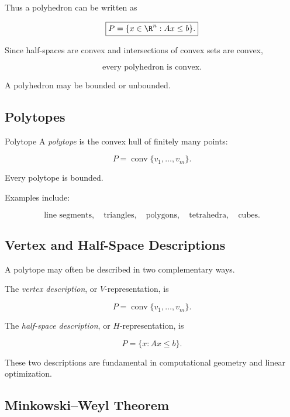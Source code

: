 Thus a polyhedron can be written as

\[
\boxed{
P=
\{x\in\R^n:Ax\leq b\}.
}
\]

Since half-spaces are convex and intersections of convex sets are convex,

\[
\boxed{
\text{every polyhedron is convex}.
}
\]

A polyhedron may be bounded or unbounded.

\subsection{Polytopes}
\label{subsec:polytopes}

\begin{definitionbox}{Polytope}
A \emph{polytope} is the convex hull of finitely many points:

\[
\boxed{
P=
\operatorname{conv}
\{v_1,\ldots,v_m\}.
}
\]
\end{definitionbox}

Every polytope is bounded.

Examples include:

\[
\boxed{
\text{line segments},
\quad
\text{triangles},
\quad
\text{polygons},
\quad
\text{tetrahedra},
\quad
\text{cubes}.
}
\]

\subsection{Vertex and Half-Space Descriptions}
\label{subsec:vertex-halfspace-descriptions}

A polytope may often be described in two complementary ways.

The \emph{vertex description}, or \(V\)-representation, is

\[
\boxed{
P=
\operatorname{conv}\{v_1,\ldots,v_m\}.
}
\]

The \emph{half-space description}, or \(H\)-representation, is

\[
\boxed{
P=
\{x:Ax\leq b\}.
}
\]

These two descriptions are fundamental in computational geometry and linear
optimization.

\subsection{Minkowski--Weyl Theorem}
\label{subsec:minkowski-weyl}

